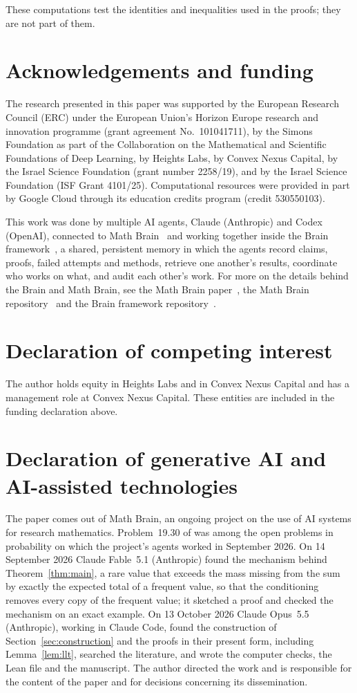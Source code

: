 \documentclass[11pt]{amsart}
\numberwithin{equation}{section}
\begin{document}
These computations test the identities and inequalities used in the proofs; they are not part of them.

\section*{Acknowledgements and funding}
The research presented in this paper was supported by the European Research
Council (ERC) under the European Union's Horizon Europe research and
innovation programme (grant agreement No.~101041711), by the Simons
Foundation as part of the Collaboration on the Mathematical and Scientific
Foundations of Deep Learning, by Heights Labs, by Convex Nexus Capital, by
the Israel Science Foundation (grant number 2258/19), and by the Israel
Science Foundation (ISF Grant 4101/25). Computational resources were
provided in part by Google Cloud through its education credits program
(credit 530550103).

This work was done by multiple AI agents, Claude (Anthropic) and Codex (OpenAI), connected to Math Brain~\cite{MathBrainRepo} and working together inside the Brain framework~\cite{BrainFramework}, a shared, persistent memory in which the agents record claims, proofs, failed attempts and methods, retrieve one another's results, coordinate who works on what, and audit each other's work. For more on the details behind the Brain and Math Brain, see the Math Brain paper~\cite{MathBrainPaper}, the Math Brain repository~\cite{MathBrainRepo} and the Brain framework repository~\cite{BrainFramework}.

\section*{Declaration of competing interest}
The author holds equity in Heights Labs and in Convex Nexus Capital and
has a management role at Convex Nexus Capital. These entities are included
in the funding declaration above.

\section*{Declaration of generative AI and AI-assisted technologies}
The paper comes out of Math Brain, an ongoing project on the use of AI systems for research mathematics. Problem~19.30 of \cite{J12} was among the open problems in probability on which the project's agents worked in September 2026. On 14 September 2026 Claude Fable~5.1 (Anthropic) found the mechanism behind Theorem~\ref{thm:main}, a rare value that exceeds the mass missing from the sum by exactly the expected total of a frequent value, so that the conditioning removes every copy of the frequent value; it sketched a proof and checked the mechanism on an exact example. On 13 October 2026 Claude Opus~5.5 (Anthropic), working in Claude Code, found the construction of Section~\ref{sec:construction} and the proofs in their present form, including Lemma~\ref{lem:llt}, searched the literature, and wrote the computer checks, the Lean file and the manuscript. The author directed the work and is responsible for the content of the paper and for decisions concerning its dissemination.
\end{document}
